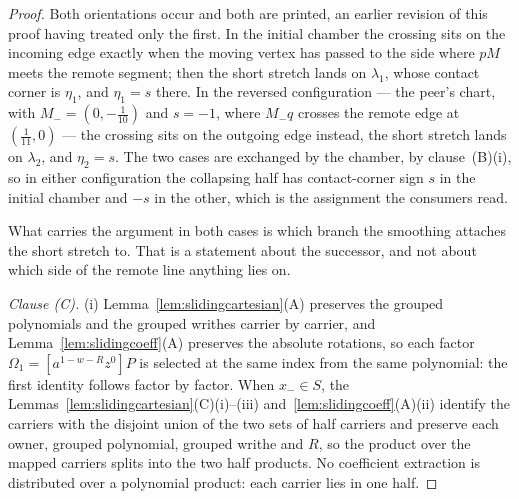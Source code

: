 \begin{proof}
Both orientations occur and both are printed, an earlier revision of this proof
having treated only the first. In the initial chamber the crossing sits on the
incoming edge exactly when the moving vertex has passed to the side where $pM$
meets the remote segment; then the short stretch lands on $\lambda_1$, whose
contact corner is $\eta_1$, and $\eta_1=s$ there. In the reversed configuration
--- the peer's chart, with $M_-=(0,-\tfrac1{10})$ and $s=-1$, where $M_-q$
crosses the remote edge at $(\tfrac1{11},0)$ --- the crossing sits on the
outgoing edge instead, the short stretch lands on $\lambda_2$, and $\eta_2=s$.
The two cases are exchanged by the chamber, by clause~(B)(i), so
in either configuration the collapsing half has contact-corner sign $s$ in the
initial chamber and $-s$ in the other, which is the assignment the consumers
read.

What carries the argument in both cases is which branch the smoothing attaches
the short stretch to. That is a statement about the successor, and not about
which side of the remote line anything lies on.

\emph{Clause (C).} (i) Lemma~\ref{lem:slidingcartesian}(A) preserves the grouped polynomials and the
grouped writhes carrier by carrier, and Lemma~\ref{lem:slidingcoeff}(A) preserves
the absolute rotations, so each factor
$\Omega_1=[a^{1-w-R}z^0]P$ is selected at the same index from the same
polynomial: the first identity follows factor by factor. When $x_-\in S$, the
Lemmas~\ref{lem:slidingcartesian}(C)(i)--(iii) and~\ref{lem:slidingcoeff}(A)(ii) identify
the carriers with the disjoint union of the two sets of half carriers and
preserve each owner, grouped polynomial, grouped writhe and $R$, so the product
over the mapped carriers splits into the two half products. No coefficient
extraction is distributed over a polynomial product: each carrier lies in one
half.


\end{proof}

